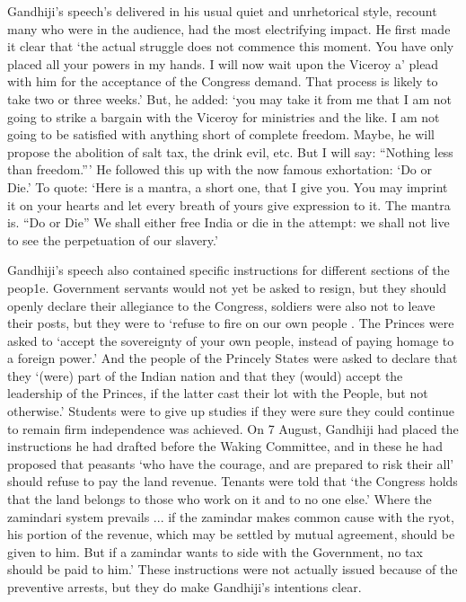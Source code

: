 Gandhiji's speech's delivered in his usual quiet and unrhetorical style, recount many who were in the audience, had the most electrifying impact. He first made it clear that `the actual struggle does not commence this moment. You have only placed all your powers in my hands. I will now wait upon the Viceroy a' plead with him for the acceptance of the Congress demand. That process is likely to take two or three weeks.' But, he added: `you may take it from me that I am not going to strike a bargain with the Viceroy for ministries and the like. I am not going to be satisfied with anything short of complete freedom. Maybe, he will propose the abolition of salt tax, the drink evil, etc. But I will say: ``Nothing less than freedom.''' He followed this up with the now famous exhortation: `Do or Die.' To quote: `Here is a mantra, a short one, that I give you. You may imprint it on your hearts and let every breath of yours give expression to it. The mantra is. ``Do or Die'' We shall either free India or die in the attempt: we shall not live to see the perpetuation of our slavery.'

Gandhiji's speech also contained specific instructions for different sections of the peop1e. Government servants would not yet be asked to resign, but they should openly declare their allegiance to the Congress, soldiers were also not to leave their posts, but they were to `refuse to fire on our own people . The Princes were asked to `accept the sovereignty of your own people, instead of paying homage to a foreign power.' And the people of the Princely States were asked to declare that they `(were) part of the Indian nation and that they (would) accept the leadership of the Princes, if the latter cast their lot with the People, but not otherwise.' Students were to give up studies if they were sure they could continue to remain firm independence was achieved. On 7 August, Gandhiji had placed the instructions he had drafted before the Waking Committee, and in these he had proposed that peasants `who have the courage, and are prepared to risk their all' should refuse to pay the land revenue. Tenants were told that `the Congress holds that the land belongs to those who work on it and to no one else.' Where the zamindari system prevails ... if the zamindar makes common cause with the ryot, his portion of the revenue, which may be settled by mutual agreement, should be given to him. But if a zamindar wants to side with the Government, no tax should be paid to him.' These instructions were not actually issued because of the preventive arrests, but they do make Gandhiji's intentions clear.

